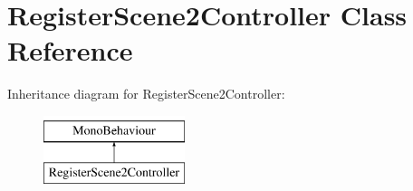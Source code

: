 \hypertarget{classRegisterScene2Controller}{}\section{Register\+Scene2\+Controller Class Reference}
\label{classRegisterScene2Controller}
Inheritance diagram for Register\+Scene2\+Controller\+:\begin{figure}[H]
\begin{center}
\leavevmode
\includegraphics[height=2.000000cm]{classRegisterScene2Controller}
\end{center}
\end{figure}
